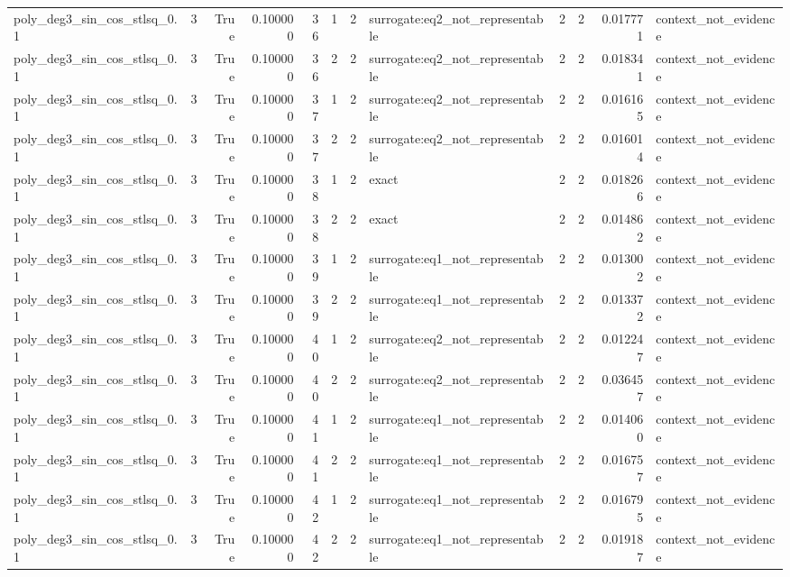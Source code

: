 \begin{tabular}{lrrrrrrlrrrl}
poly\_deg3\_sin\_cos\_stlsq\_0.1 & 3 & True & 0.100000 & 36 & 1 & 2 & surrogate:eq2\_not\_representable & 2 & 2 & 0.017771 & context\_not\_evidence \\
poly\_deg3\_sin\_cos\_stlsq\_0.1 & 3 & True & 0.100000 & 36 & 2 & 2 & surrogate:eq2\_not\_representable & 2 & 2 & 0.018341 & context\_not\_evidence \\
poly\_deg3\_sin\_cos\_stlsq\_0.1 & 3 & True & 0.100000 & 37 & 1 & 2 & surrogate:eq2\_not\_representable & 2 & 2 & 0.016165 & context\_not\_evidence \\
poly\_deg3\_sin\_cos\_stlsq\_0.1 & 3 & True & 0.100000 & 37 & 2 & 2 & surrogate:eq2\_not\_representable & 2 & 2 & 0.016014 & context\_not\_evidence \\
poly\_deg3\_sin\_cos\_stlsq\_0.1 & 3 & True & 0.100000 & 38 & 1 & 2 & exact & 2 & 2 & 0.018266 & context\_not\_evidence \\
poly\_deg3\_sin\_cos\_stlsq\_0.1 & 3 & True & 0.100000 & 38 & 2 & 2 & exact & 2 & 2 & 0.014862 & context\_not\_evidence \\
poly\_deg3\_sin\_cos\_stlsq\_0.1 & 3 & True & 0.100000 & 39 & 1 & 2 & surrogate:eq1\_not\_representable & 2 & 2 & 0.013002 & context\_not\_evidence \\
poly\_deg3\_sin\_cos\_stlsq\_0.1 & 3 & True & 0.100000 & 39 & 2 & 2 & surrogate:eq1\_not\_representable & 2 & 2 & 0.013372 & context\_not\_evidence \\
poly\_deg3\_sin\_cos\_stlsq\_0.1 & 3 & True & 0.100000 & 40 & 1 & 2 & surrogate:eq2\_not\_representable & 2 & 2 & 0.012247 & context\_not\_evidence \\
poly\_deg3\_sin\_cos\_stlsq\_0.1 & 3 & True & 0.100000 & 40 & 2 & 2 & surrogate:eq2\_not\_representable & 2 & 2 & 0.036457 & context\_not\_evidence \\
poly\_deg3\_sin\_cos\_stlsq\_0.1 & 3 & True & 0.100000 & 41 & 1 & 2 & surrogate:eq1\_not\_representable & 2 & 2 & 0.014060 & context\_not\_evidence \\
poly\_deg3\_sin\_cos\_stlsq\_0.1 & 3 & True & 0.100000 & 41 & 2 & 2 & surrogate:eq1\_not\_representable & 2 & 2 & 0.016757 & context\_not\_evidence \\
poly\_deg3\_sin\_cos\_stlsq\_0.1 & 3 & True & 0.100000 & 42 & 1 & 2 & surrogate:eq1\_not\_representable & 2 & 2 & 0.016795 & context\_not\_evidence \\
poly\_deg3\_sin\_cos\_stlsq\_0.1 & 3 & True & 0.100000 & 42 & 2 & 2 & surrogate:eq1\_not\_representable & 2 & 2 & 0.019187 & context\_not\_evidence \\

\end{tabular}
